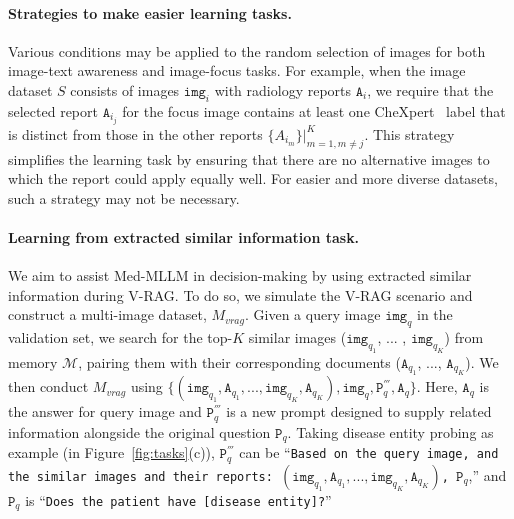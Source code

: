 \paragraph{Strategies to make easier learning tasks.}
Various conditions may be applied to the random selection of images for both image-text awareness and image-focus tasks.
For example, when the image dataset $S$ consists of images $\texttt{img}_i$ with radiology reports $\texttt{A}_i$, we  require that the selected report $\texttt{A}_{i_j}$ for the focus image contains at least one CheXpert~\cite{Irvin2019CheXpertAL} label that is distinct from those in the other reports $\{A_{{i_m}}\}|^{K}_{m = 1, m \neq j}$.
This strategy simplifies the learning task by ensuring that there are no alternative images to which the report could apply equally well.
For easier and more diverse datasets, such a strategy may not be necessary.


\paragraph{Learning from extracted similar information task.}
We aim to assist Med-MLLM in decision-making by using extracted similar information during V-RAG. 
To do so, we simulate the V-RAG scenario and construct a multi-image dataset, $M_{vrag}$.
Given a query image $\texttt{img}_{q}$ in the validation set, we search for the top-$K$ similar images ($\texttt{img}_{q_1}$, ... , $\texttt{img}_{q_K}$) from memory $\mathcal{M}$, pairing them with their corresponding documents ($\texttt{A}_{q_1}$, ..., $\texttt{A}_{q_K}$).
We then conduct $M_{vrag}$ using $\{(\texttt{img}_{q_1},  \texttt{A}_{q_1}, ..., \texttt{img}_{q_K}, \texttt{A}_{q_K}), \texttt{img}_{q}, \texttt{P}^{'''}_{q}, \texttt{A}_{q}\}$.
Here, $ \texttt{A}_{q}$ is the answer for query image and $\texttt{P}^{'''}_{q}$ is a new prompt designed to supply related information alongside the original question $\texttt{P}_{q}$.
Taking disease entity probing as example (in Figure~\ref{fig:tasks}(c)), $\texttt{P}^{'''}_{q}$ can be ``\texttt{Based on the query image, and the similar images and their reports: $(\texttt{img}_{q_1},  \texttt{A}_{q_1}, ..., \texttt{img}_{q_K}, \texttt{A}_{q_K})$, $\texttt{P}_{q}$},'' and $\texttt{P}_{q}$ is ``\texttt{Does the patient have [disease entity]?}''


